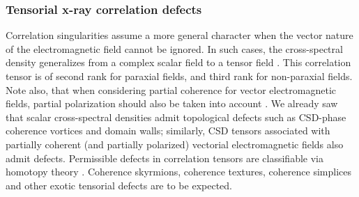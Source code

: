\documentclass[%
 reprint,
 amsmath,amssymb,
 aps,
]{revtex4-1}
\begin{document}


\subsubsection{Tensorial x-ray correlation defects} 

Correlation singularities assume a more general character when the vector nature of the electromagnetic field cannot be ignored.  In such cases, the cross-spectral density generalizes from a complex scalar field to a tensor field \cite{mandel_wolf,wolf_thin_book}.  This correlation tensor is of second rank for paraxial fields, and third rank for non-paraxial fields.  Note also, that when considering partial coherence for vector electromagnetic fields, partial polarization should also be taken into account \cite{wolf_thin_book}.  We already saw that scalar cross-spectral densities admit topological defects such as CSD-phase coherence vortices and domain walls; similarly, CSD tensors associated with partially coherent (and partially polarized) vectorial electromagnetic fields also admit defects.  Permissible defects in correlation tensors are classifiable via homotopy theory \cite{VilenkinShellard1994,Volovik2003}.  Coherence skyrmions, coherence textures, coherence simplices \cite{SimulaPaganin2012} and other exotic tensorial defects are to be expected.
\end{document}
